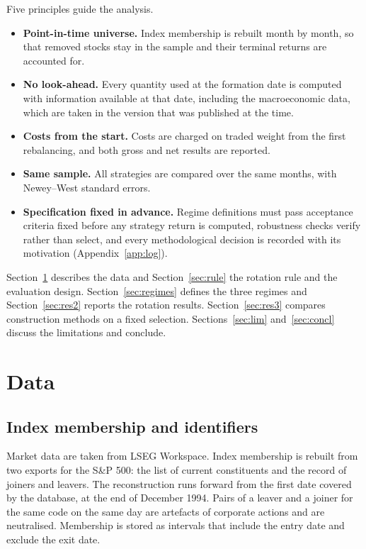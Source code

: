 \documentclass[11pt,a4paper]{article}
\begin{document}
Five principles guide the analysis.
\begin{itemize}
\item \textbf{Point-in-time universe.} Index membership is rebuilt month by month, so that removed stocks stay in the sample and their terminal returns are accounted for.
\item \textbf{No look-ahead.} Every quantity used at the formation date is computed with information available at that date, including the macroeconomic data, which are taken in the version that was published at the time.
\item \textbf{Costs from the start.} Costs are charged on traded weight from the first rebalancing, and both gross and net results are reported.
\item \textbf{Same sample.} All strategies are compared over the same months, with Newey--West standard errors.
\item \textbf{Specification fixed in advance.} Regime definitions must pass acceptance criteria fixed before any strategy return is computed, robustness checks verify rather than select, and every methodological decision is recorded with its motivation (Appendix~\ref{app:log}).
\end{itemize}

Section~\ref{sec:data} describes the data and Section~\ref{sec:rule} the rotation rule and the evaluation design. Section~\ref{sec:regimes} defines the three regimes and Section~\ref{sec:res2} reports the rotation results. Section~\ref{sec:res3} compares construction methods on a fixed selection. Sections~\ref{sec:lim} and~\ref{sec:concl} discuss the limitations and conclude.

\section{Data}\label{sec:data}

\subsection{Index membership and identifiers}

Market data are taken from LSEG Workspace. Index membership is rebuilt from two exports for the S\&P 500: the list of current constituents and the record of joiners and leavers. The reconstruction runs forward from the first date covered by the database, at the end of December 1994. Pairs of a leaver and a joiner for the same code on the same day are artefacts of corporate actions and are neutralised. Membership is stored as intervals that include the entry date and exclude the exit date.
\end{document}
